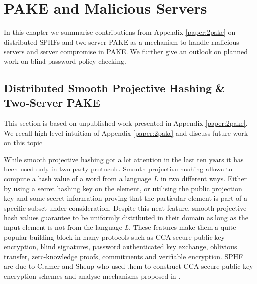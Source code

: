 \chapter{PAKE and Malicious Servers}\label{ch:malservers}
In this chapter we summarise contributions from Appendix \ref{paper:2pake} on distributed \aclp{SPHF} and two-server \ac{PAKE} as a mechanism to handle malicious servers and server compromise in \acl{PAKE}.
We further give an outlook on planned work on blind password policy checking.

\section{Distributed Smooth Projective Hashing \& Two-Server PAKE} \label{sec:twopake}
This section is based on unpublished work presented in Appendix \ref{paper:2pake}.
We recall high-level intuition of Appendix \ref{paper:2pake} and discuss future work on this topic.

While smooth projective hashing got a lot attention in the last ten years it has been used only in two-party protocols.
Smooth projective hashing allows to compute a hash value of a word from a language $L$ in two different ways.
Either by using a secret hashing key on the element, or utilising the public projection key and some secret information proving that the particular element is part of a specific subset under consideration.
Despite this neat feature, smooth projective hash values guarantee to be uniformly distributed in their domain as long as the input element is not from the language $L$.
These features make them a quite popular building block in many protocols such as \ac{CCA}-secure public key encryption, blind signatures, password authenticated key exchange, oblivious transfer, zero-knowledge proofs, commitments and verifiable encryption.
\ac{SPHF} are due to Cramer and Shoup \cite{Cramer2001} who used them to construct \ac{CCA}-secure public key encryption schemes and analyse mechanisms proposed in \cite{Cramer1998}.

